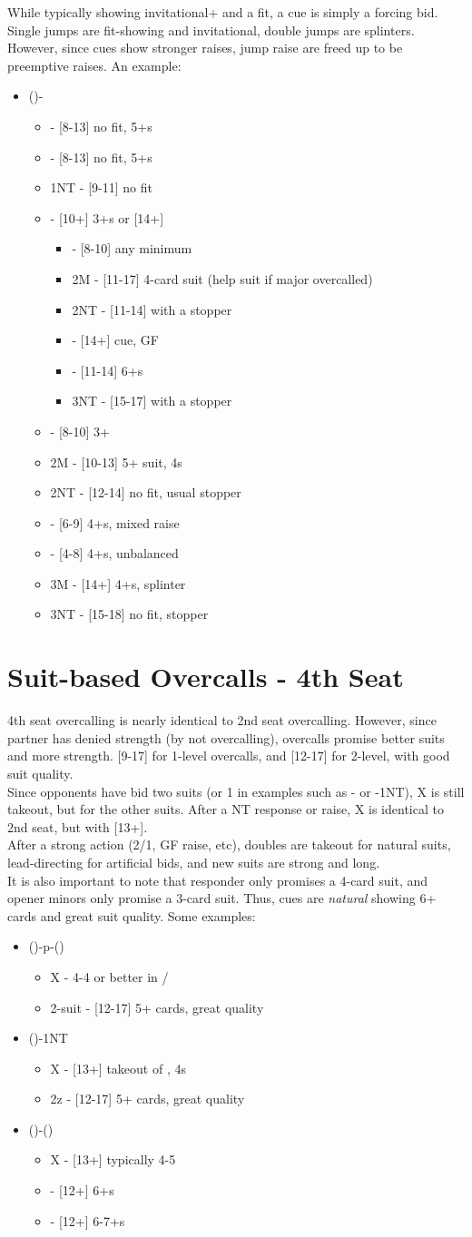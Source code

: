 \documentclass[12pt]{report}
\newcommand{\n}{\\}
\newcommand{\ul}[1]{\begin{itemize}#1\end{itemize}}
\newcommand{\li}{\item[~]}
\begin{document}
    While typically showing invitational+ and a fit, a cue is simply a forcing bid.  Single jumps are fit-showing and invitational, double jumps are splinters.  However, since cues show stronger raises, jump raise are freed up to be preemptive raises.  An example:

    \ul {
        \li ()-
        \ul {
            \li {} - [8-13] no fit, 5+\he{}s
            \li \sp1 - [8-13] no fit, 5+\sp{}s
            \li 1NT - [9-11] no fit
            \li \cl2 - [10+] 3+\di{}s or [14+]
            \ul {
                \li \di2 - [8-10] any minimum
                \li 2M - [11-17] 4-card suit (help suit if major overcalled)
                \li 2NT - [11-14] with a stopper
                \li \cl3 - [14+] cue, GF
                \li \di3 - [11-14] 6+\di{}s
                \li 3NT - [15-17] with a stopper
            }
            \li \di2 - [8-10] 3+\di{}
            \li 2M - [10-13] 5+ suit, 4\di{}s
            \li 2NT - [12-14] no fit, usual stopper
            \li \cl3 - [6-9] 4+\di{}s, mixed raise
            \li \di3 - [4-8] 4+\di{}s, unbalanced
            \li 3M - [14+] 4+\di{}s, splinter
            \li 3NT - [15-18] no fit, stopper
        }
    }

\newpage
\section{Suit-based Overcalls - 4th Seat} \label{4:3}

    4th seat overcalling is nearly identical to 2nd seat overcalling.  However, since partner has denied strength (by not overcalling), overcalls promise better suits and more strength.  [9-17] for 1-level overcalls, and [12-17] for 2-level, with good suit quality. \n

    Since opponents have bid two suits (or 1 in examples such as - or -1NT), X is still takeout, but for the other suits.  After a NT response or raise, X is identical to 2nd seat, but with [13+]. \n

    After a strong action (2/1, GF raise, etc), doubles are takeout for natural suits, lead-directing for artificial bids, and new suits are strong and long. \n
    
    It is also important to note that responder only promises a 4-card suit, and opener minors only promise a 3-card suit.  Thus, cues are \textit{natural} showing 6+ cards and great suit quality.  Some examples:

    \ul {
        \li ()-p-()
        \ul {
            \li X - 4-4 or better in \di{}/\he{}
            \li 2-suit - [12-17] 5+ cards, great quality
        }
        \li (\he1)-1NT
        \ul {
            \li X - [13+] takeout of \he, 4\sp{}s
            \li 2z - [12-17] 5+ cards, great quality
        }
        \li (\sp1)-(\di2)
        \ul {
            \li X - [13+] typically 4-5
            \li \he2 - [12+] 6+\he{}s
            \li \cl3 - [12+] 6-7+\cl{}s
        }
    }
\end{document}

